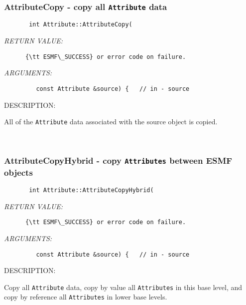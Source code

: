  
\mbox{}\hrulefill\
 
\subsubsection [AttributeCopy] {AttributeCopy - copy all {\tt Attribute} data }


  
\begin{verbatim}       int Attribute::AttributeCopy(
   \end{verbatim}{\em RETURN VALUE:}
\begin{verbatim}      {\tt ESMF\_SUCCESS} or error code on failure.
   \end{verbatim}{\em ARGUMENTS:}
\begin{verbatim}         const Attribute &source) {   // in - source
   \end{verbatim}
{\sf DESCRIPTION:\\ }


       All of the {\tt Attribute} data associated with the source object is 
       copied.
   
 
\mbox{}\hrulefill\
 
\subsubsection [AttributeCopyHybrid] {AttributeCopyHybrid - copy {\tt Attributes} between ESMF objects}


  
\begin{verbatim}       int Attribute::AttributeCopyHybrid(\end{verbatim}{\em RETURN VALUE:}
\begin{verbatim}      {\tt ESMF\_SUCCESS} or error code on failure.\end{verbatim}{\em ARGUMENTS:}
\begin{verbatim}         const Attribute &source) {   // in - source\end{verbatim}
{\sf DESCRIPTION:\\ }


     Copy all {\tt Attribute} data, copy by value all {\tt Attributes} in this
     base level, and copy by reference all {\tt Attributes} in lower base levels.
   
